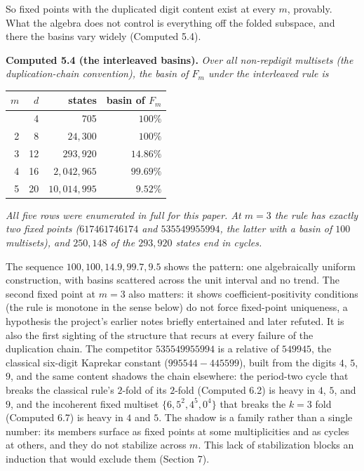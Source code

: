 \documentclass[11pt,letterpaper]{article}
\theoremstyle{paperstyle}
\theoremstyle{paperstyledef}
\theoremstyle{paperstylerem}
\begin{document}
So fixed points with the duplicated digit content exist at every \(m\), provably. What the algebra does not control is everything off the folded subspace, and there the basins vary widely (Computed 5.4).

\textbf{Computed 5.4 (the interleaved basins).} \emph{Over all non-repdigit multisets (the duplication-chain convention), the basin of \(F_m\) under the interleaved rule is}

{\def\LTcaptype{none} %
\begin{longtable}[]{@{}rrrr@{}}
\toprule\noalign{}
\(m\) & \(d\) & states & basin of \(F_m\) \\
\midrule\noalign{}
\endhead
\bottomrule\noalign{}
\endlastfoot
1 & 4 & 705 & \(100\%\) \\
2 & 8 & \(24{,}300\) & \(100\%\) \\
3 & 12 & \(293{,}920\) & \(14.86\%\) \\
4 & 16 & \(2{,}042{,}965\) & \(99.69\%\) \\
5 & 20 & \(10{,}014{,}995\) & \(9.52\%\) \\
\end{longtable}
}

\emph{All five rows were enumerated in full for this paper. At \(m = 3\) the rule has exactly two fixed points (\(617461746174\) and \(535549955994\), the latter with a basin of \(100\) multisets), and \(250{,}148\) of the \(293{,}920\) states end in cycles.}

The sequence \(100, 100, 14.9, 99.7, 9.5\) shows the pattern: one algebraically uniform construction, with basins scattered across the unit interval and no trend. The second fixed point at \(m = 3\) also matters: it shows coefficient-positivity conditions (the rule is monotone in the sense below) do not force fixed-point uniqueness, a hypothesis the project's earlier notes briefly entertained and later refuted. It is also the first sighting of the structure that recurs at every failure of the duplication chain. The competitor \(535549955994\) is a relative of \(549945\), the classical six-digit Kaprekar constant (\(995544 - 445599\)), built from the digits \(4\), \(5\), \(9\), and the same content shadows the chain elsewhere: the period-two cycle that breaks the classical rule's \(2\)-fold of its \(2\)-fold (Computed 6.2) is heavy in \(4\), \(5\), and \(9\), and the incoherent fixed multiset \(\{6, 5^2, 4^5, 0^4\}\) that breaks the \(k = 3\) fold (Computed 6.7) is heavy in \(4\) and \(5\). The shadow is a family rather than a single number: its members surface as fixed points at some multiplicities and as cycles at others, and they do not stabilize across \(m\). This lack of stabilization blocks an induction that would exclude them (Section 7).
\end{document}
